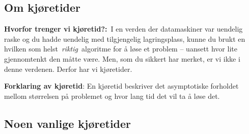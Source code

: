 \documentclass[12pt]{report}
\begin{document}
\subsection*{Om kjøretider}
\textbf{Hvorfor trenger vi kjøretid?:} I en verden der datamaskiner var uendelig raske og du hadde uendelig med tilgjengelig lagringsplass, kunne du brukt en hvilken som helst \textit{riktig} algoritme for å løse et problem – uansett hvor lite gjennomtenkt den måtte være. Men, som du sikkert har merket, er vi ikke i denne verdenen. Derfor har vi kjøretider.\par

\textbf{Forklaring av kjøretid}: En kjøretid beskriver det asymptotiske forholdet mellom størrelsen på problemet og hvor lang tid det vil ta å løse det.\par


\vspace{\baselineskip}
\subsection*{Noen vanlige kjøretider}


\end{document}
